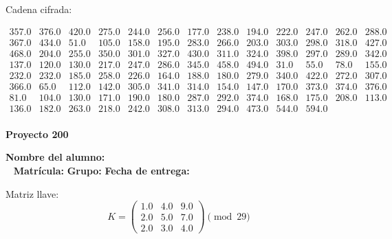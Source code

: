 \documentclass[12pt]{article}
\begin{document}
Cadena cifrada:
\begin{center}
$\begin{array}{lllllllllllll}
357.0 & 376.0 & 420.0 & 275.0 & 244.0 & 256.0 & 177.0 & 238.0 & 194.0 & 222.0 & 247.0 & 262.0 & 288.0\\
367.0 & 434.0 & 51.0 & 105.0 & 158.0 & 195.0 & 283.0 & 266.0 & 203.0 & 303.0 & 298.0 & 318.0 & 427.0\\
468.0 & 204.0 & 255.0 & 350.0 & 301.0 & 327.0 & 430.0 & 311.0 & 324.0 & 398.0 & 297.0 & 289.0 & 342.0\\
137.0 & 120.0 & 130.0 & 217.0 & 247.0 & 286.0 & 345.0 & 458.0 & 494.0 & 31.0 & 55.0 & 78.0 & 155.0\\
232.0 & 232.0 & 185.0 & 258.0 & 226.0 & 164.0 & 188.0 & 180.0 & 279.0 & 340.0 & 422.0 & 272.0 & 307.0\\
366.0 & 65.0 & 112.0 & 142.0 & 305.0 & 341.0 & 314.0 & 154.0 & 147.0 & 170.0 & 373.0 & 374.0 & 376.0\\
81.0 & 104.0 & 130.0 & 171.0 & 190.0 & 180.0 & 287.0 & 292.0 & 374.0 & 168.0 & 175.0 & 208.0 & 113.0\\
136.0 & 182.0 & 263.0 & 218.0 & 242.0 & 308.0 & 313.0 & 294.0 & 473.0 & 544.0 & 594.0\\
\end{array}$
\end{center}

\newpage


\textbf{Proyecto 200}

\textbf{Nombre del alumno:} \underline{\hspace{13cm}}\\\
\vspace{1cm}
\textbf{Matrícula:} \underline{\hspace{4cm}} \hspace{1cm}
\textbf{Grupo:} \underline{\hspace{2cm}}
\textbf{Fecha de entrega:} \underline{\hspace{2cm}}

\medskip

Matriz llave:
\[
K = \begin{pmatrix}
1.0 & 4.0 & 9.0\\
2.0 & 5.0 & 7.0\\
2.0 & 3.0 & 4.0
\end{pmatrix} \pmod{29}
\]
\end{document}
